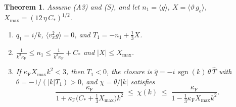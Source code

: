 \documentclass[11pt]{article}
\newcommand{\sgn}{\operatorname{sgn}}
\newcommand{\avg}[1]{\langle #1\rangle}
\newtheorem{theorem}{Theorem}
\theoremstyle{remark}
\begin{document}
\begin{theorem}\label{thm:3d}
Assume (A3) and (S), and let $n_1=\avg{g}$,
$X=\avg{\vartheta\,g_e}$, $X_{\max}=(12\,\eta\,C_*)^{1/2}$.
\begin{enumerate}
  \item[(i)] $q_1=i/k$, $\avg{v_x^2g}=0$, and
    $T_1=-n_1+\tfrac13X$.
  \item[(ii)] $\displaystyle\frac{1}{k^2\kappa_{\mathrm F}}\le n_1\le
    \frac{1}{k^2\kappa_{\mathrm F}}+C_*$ and $|X|\le X_{\max}$.
  \item[(iii)] If $\kappa_{\mathrm F}X_{\max}k^2<3$, then $T_1<0$, the
    closure is $\hat q=-i\,\sgn(k)\,\theta\,\hat T$ with
    $\theta=-1/(|k|T_1)>0$, and $\chi=\theta/|k|$ satisfies
    \begin{equation}
      \frac{\kappa_{\mathrm F}}
           {1+\kappa_{\mathrm F}\bigl(C_*+\tfrac13X_{\max}\bigr)k^2}
      \;\le\;\chi(k)\;\le\;
      \frac{\kappa_{\mathrm F}}{1-\tfrac13\kappa_{\mathrm F}X_{\max}k^2}.
      \label{eq:bounds}
    \end{equation}
\end{enumerate}
\end{theorem}
\end{document}
